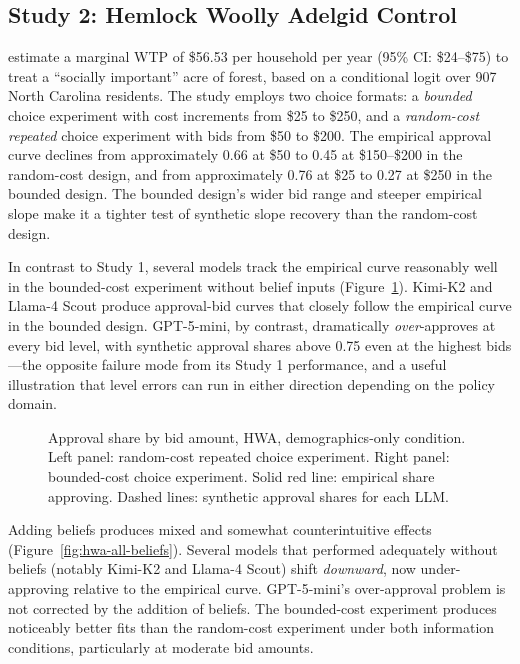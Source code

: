 \documentclass[12pt]{article}
\begin{document}
\subsection{Study 2: Hemlock Woolly Adelgid Control}\label{sec:results-hwa}

\textcite{Giguere2020} estimate a marginal WTP of \$56.53 per household
per year (95\% CI: \$24--\$75) to treat a ``socially important'' acre of
forest, based on a conditional logit over 907 North Carolina residents.
The study employs two choice formats: a \emph{bounded} choice experiment
with cost increments from \$25 to \$250, and a \emph{random-cost
repeated} choice experiment with bids from \$50 to \$200. The empirical
approval curve declines from approximately 0.66 at \$50 to 0.45 at
\$150--\$200 in the random-cost design, and from approximately 0.76 at
\$25 to 0.27 at \$250 in the bounded design. The bounded design's wider
bid range and steeper empirical slope make it a tighter test of synthetic
slope recovery than the random-cost design.

In contrast to Study 1, several models track the empirical curve
reasonably well in the bounded-cost experiment without belief inputs
(Figure~\ref{fig:hwa-demo-only}). Kimi-K2 and Llama-4 Scout produce
approval-bid curves that closely follow the empirical curve in the
bounded design. GPT-5-mini, by contrast, dramatically \emph{over}-approves
at every bid level, with synthetic approval shares above 0.75 even at
the highest bids---the opposite failure mode from its Study 1
performance, and a useful illustration that level errors can run in
either direction depending on the policy domain.

\begin{figure}[h]
    \centering
    \caption{Approval share by bid amount, HWA, demographics-only
    condition. Left panel: random-cost repeated choice experiment.
    Right panel: bounded-cost choice experiment. Solid red line:
    empirical share approving. Dashed lines: synthetic approval shares
    for each LLM.}
    \label{fig:hwa-demo-only}
\end{figure}

Adding beliefs produces mixed and somewhat counterintuitive effects
(Figure~\ref{fig:hwa-all-beliefs}). Several models that performed
adequately without beliefs (notably Kimi-K2 and Llama-4 Scout) shift
\emph{downward}, now under-approving relative to the empirical curve.
GPT-5-mini's over-approval problem is not corrected by the addition of
beliefs. The bounded-cost experiment produces noticeably better fits
than the random-cost experiment under both information conditions,
particularly at moderate bid amounts.
\end{document}
